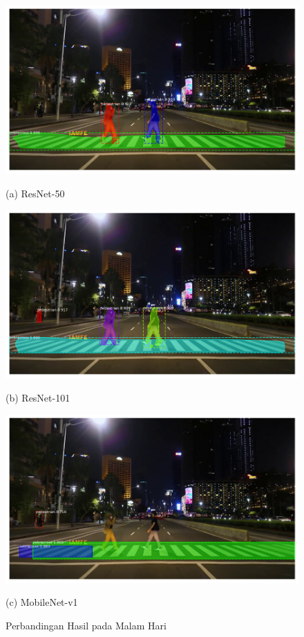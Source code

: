 \begin{figure}[H]
	\centering
	\begin{minipage}[b]{0.3\textwidth}
		\includegraphics[width=\textwidth]{gambar/hasil/resnet-50_malam_180.png}
		\caption*{(a) ResNet-50}
	\end{minipage}
	\hfill
	\begin{minipage}[b]{0.3\textwidth}
		\includegraphics[width=\textwidth]{gambar/hasil/resnet-101_malam_180.png}
		\caption*{(b) ResNet-101}
	\end{minipage}
	\hfill
	\begin{minipage}[b]{0.3\textwidth}
		\includegraphics[width=\textwidth]{gambar/malam-frame180-mobilnetv1.png}
		\caption*{(c) MobileNet-v1}
	\end{minipage}
	\caption{{Perbandingan Hasil pada Malam Hari}}
	\label{fig:comparasion-night}
\end{figure}

